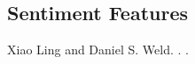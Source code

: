 \documentclass[11pt,letterpaper]{article}
\begin{document}
\subsection{Sentiment Features}

\begin{thebibliography}{}

Xiao Ling and Daniel S. Weld.
.
.




\end{thebibliography}
\end{document}
